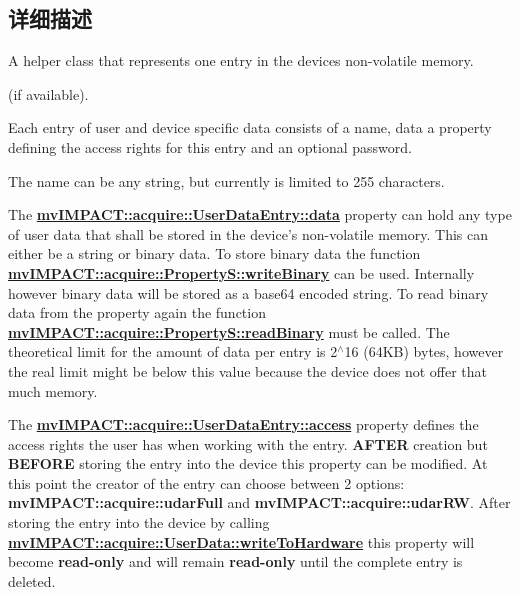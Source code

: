 \subsection{详细描述}
A helper class that represents one entry in the devices non-\/volatile memory. 

(if available).

Each entry of user and device specific data consists of a name, data a property defining the access rights for this entry and an optional password.

The name can be any string, but currently is limited to 255 characters.

The {\bfseries \hyperlink{classmv_i_m_p_a_c_t_1_1acquire_1_1_user_data_entry_a3dfca06b8c8b7368fd36382ddf95ac46}{mv\+I\+M\+P\+A\+C\+T\+::acquire\+::\+User\+Data\+Entry\+::data}} property can hold any type of user data that shall be stored in the device's non-\/volatile memory. This can either be a string or binary data. To store binary data the function {\bfseries \hyperlink{classmv_i_m_p_a_c_t_1_1acquire_1_1_property_s_ac08293bd5d249b57a66ea5d325c9a37a}{mv\+I\+M\+P\+A\+C\+T\+::acquire\+::\+Property\+S\+::write\+Binary}} can be used. Internally however binary data will be stored as a base64 encoded string. To read binary data from the property again the function {\bfseries \hyperlink{classmv_i_m_p_a_c_t_1_1acquire_1_1_property_s_a29342383600102e22fd6e235fcd63728}{mv\+I\+M\+P\+A\+C\+T\+::acquire\+::\+Property\+S\+::read\+Binary}} must be called. The theoretical limit for the amount of data per entry is 2$^\wedge$16 (64\+K\+B) bytes, however the real limit might be below this value because the device does not offer that much memory.

The {\bfseries \hyperlink{classmv_i_m_p_a_c_t_1_1acquire_1_1_user_data_entry_a918aecd20592f81141f12d5ceeff17da}{mv\+I\+M\+P\+A\+C\+T\+::acquire\+::\+User\+Data\+Entry\+::access}} property defines the access rights the user has when working with the entry. {\bfseries A\+F\+T\+E\+R} creation but {\bfseries B\+E\+F\+O\+R\+E} storing the entry into the device this property can be modified. At this point the creator of the entry can choose between 2 options\+: {\bfseries mv\+I\+M\+P\+A\+C\+T\+::acquire\+::udar\+Full} and {\bfseries mv\+I\+M\+P\+A\+C\+T\+::acquire\+::udar\+R\+W}. After storing the entry into the device by calling {\bfseries \hyperlink{classmv_i_m_p_a_c_t_1_1acquire_1_1_user_data_ae6e2e87a923281c6a821b0f221b968b8}{mv\+I\+M\+P\+A\+C\+T\+::acquire\+::\+User\+Data\+::write\+To\+Hardware}} this property will become {\bfseries read-\/only} and will remain {\bfseries read-\/only} until the complete entry is deleted.


